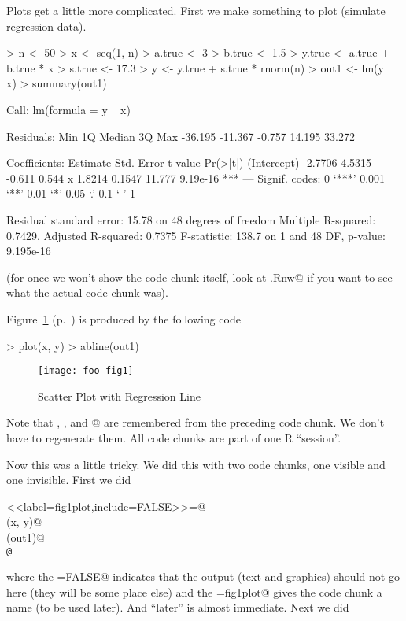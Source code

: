 \documentclass{article}
\begin{document}
\pagebreak[3]
Plots get a little more complicated.  First we make something to plot
(simulate regression data).

\begin{Schunk}
\begin{Sinput}
> n <- 50
> x <- seq(1, n)
> a.true <- 3
> b.true <- 1.5
> y.true <- a.true + b.true * x
> s.true <- 17.3
> y <- y.true + s.true * rnorm(n)
> out1 <- lm(y ~ x)
> summary(out1)
\end{Sinput}
\begin{Soutput}
Call:
lm(formula = y ~ x)

Residuals:
    Min      1Q  Median      3Q     Max 
-36.195 -11.367  -0.757  14.195  33.272 

Coefficients:
            Estimate Std. Error t value Pr(>|t|)    
(Intercept)  -2.7706     4.5315  -0.611    0.544    
x             1.8214     0.1547  11.777 9.19e-16 ***
---
Signif. codes:  0 ‘***’ 0.001 ‘**’ 0.01 ‘*’ 0.05 ‘.’ 0.1 ‘ ’ 1 

Residual standard error: 15.78 on 48 degrees of freedom
Multiple R-squared: 0.7429,	Adjusted R-squared: 0.7375 
F-statistic: 138.7 on 1 and 48 DF,  p-value: 9.195e-16 
\end{Soutput}
\end{Schunk}

(for once we won't show the code chunk itself, look at \verb@foo.Rnw@
if you want to see what the actual code chunk was).

Figure~\ref{fig:one} (p.~\pageref{fig:one})
is produced by the following code

\begin{Schunk}
\begin{Sinput}
> plot(x, y)
> abline(out1)
\end{Sinput}
\end{Schunk}

\begin{figure}
\begin{center}
\texttt{[image: foo-fig1]}
\end{center}
\caption{Scatter Plot with Regression Line}
\label{fig:one}
\end{figure}

Note that \verb@x@, \verb@y@, and @ are remembered from
the preceding code chunk.  We don't have to regenerate them.
All code chunks are part of one R ``session''.

Now this was a little tricky.  We did this with two code chunks,
one visible and one invisible.  First we did
\begin{tabbing}
\verb@<<label=fig1plot,include=FALSE>>=@ \\
\verb@plot(x, y)@ \\
\verb@abline(out1)@ \\
\verb+@+
\end{tabbing}
where the \verb@include=FALSE@ indicates that the output (text and graphics)
should not go here (they will be some place else) and the \verb@label=fig1plot@
gives the code chunk a name (to be used later).  And ``later'' is almost
immediate.  Next we did
\end{document}
